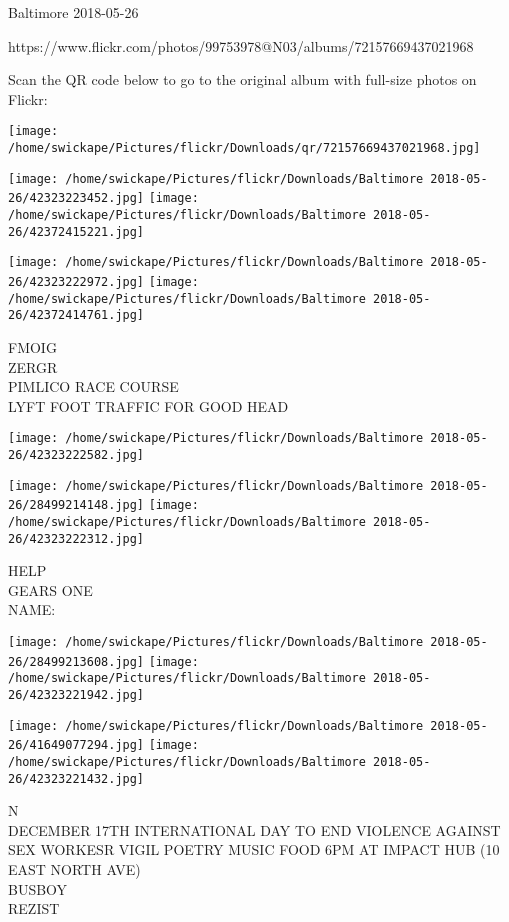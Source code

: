 \documentclass[10pt,letterpaper]{article}
\begin{document}
Baltimore 2018-05-26

https://www.flickr.com/photos/99753978@N03/albums/72157669437021968

Scan the QR code below to go to the original album with full-size photos on Flickr:

\texttt{[image: /home/swickape/Pictures/flickr/Downloads/qr/72157669437021968.jpg]}
\pagebreak

\texttt{[image: /home/swickape/Pictures/flickr/Downloads/Baltimore 2018-05-26/42323223452.jpg]}
\texttt{[image: /home/swickape/Pictures/flickr/Downloads/Baltimore 2018-05-26/42372415221.jpg]}

\texttt{[image: /home/swickape/Pictures/flickr/Downloads/Baltimore 2018-05-26/42323222972.jpg]}
\texttt{[image: /home/swickape/Pictures/flickr/Downloads/Baltimore 2018-05-26/42372414761.jpg]}

FMOIG\\
ZERGR\\
PIMLICO RACE COURSE\\
LYFT FOOT TRAFFIC FOR GOOD HEAD\\
\pagebreak

\texttt{[image: /home/swickape/Pictures/flickr/Downloads/Baltimore 2018-05-26/42323222582.jpg]}

\vspace{0.25in}
\texttt{[image: /home/swickape/Pictures/flickr/Downloads/Baltimore 2018-05-26/28499214148.jpg]}
\texttt{[image: /home/swickape/Pictures/flickr/Downloads/Baltimore 2018-05-26/42323222312.jpg]}

HELP\\
GEARS ONE\\
NAME:\\
\pagebreak

\texttt{[image: /home/swickape/Pictures/flickr/Downloads/Baltimore 2018-05-26/28499213608.jpg]}
\texttt{[image: /home/swickape/Pictures/flickr/Downloads/Baltimore 2018-05-26/42323221942.jpg]}

\texttt{[image: /home/swickape/Pictures/flickr/Downloads/Baltimore 2018-05-26/41649077294.jpg]}
\texttt{[image: /home/swickape/Pictures/flickr/Downloads/Baltimore 2018-05-26/42323221432.jpg]}

N\\
DECEMBER 17TH INTERNATIONAL DAY TO END VIOLENCE AGAINST SEX WORKESR VIGIL POETRY MUSIC FOOD 6PM AT IMPACT HUB (10 EAST NORTH AVE)\\
BUSBOY\\
REZIST\\
\pagebreak
\end{document}
